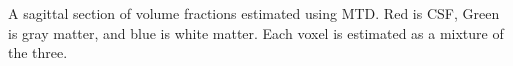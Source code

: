 \label{fig:volFrac} A sagittal section of volume fractions estimated using MTD. Red is CSF, Green is gray matter, and blue is white matter. Each voxel is estimated as a mixture of the three.